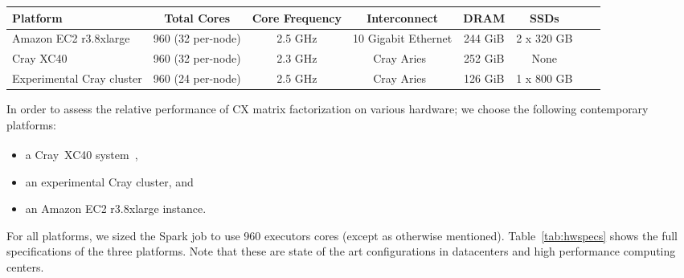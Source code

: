   \begin{table*}
    \begin{center}
    \begin{tabular}{| l | c | c | c | c | c | c | c |}
    \toprule
    \textbf{Platform} & \textbf{Total Cores} & \textbf{Core Frequency} & \textbf{Interconnect} & \textbf{DRAM} & \textbf{SSDs} \\
    \midrule
    Amazon EC2 r3.8xlarge & 960 (32 per-node) & 2.5 GHz & 10 Gigabit Ethernet & 244 GiB & 2 x 320 GB \\
    \midrule
    Cray XC40 & 960 (32 per-node) & 2.3 GHz & Cray Aries~\cite{alverson2012cray,craycascadesc12} & 252 GiB & None \\
    \midrule
    Experimental Cray cluster & 960 (24 per-node) & 2.5 GHz & Cray Aries~\cite{alverson2012cray,craycascadesc12} & 126 GiB & 1 x 800 GB \\
    \bottomrule
    \end{tabular}
    \end{center}
    \caption{Specifications of the three hardware platforms used in these performance experiments.}
    \label{tab:hwspecs}
  \end{table*}

 In order to assess the relative performance of CX matrix factorization on various hardware; we choose the following contemporary platforms:
 \begin{itemize}
 \item a Cray\textregistered~XC40\textsuperscript{\tiny\texttrademark}
 system~\cite{alverson2012cray,craycascadesc12},
 \item an experimental Cray cluster, and
 \item an Amazon EC2 r3.8xlarge instance.
 \end{itemize}
 For all platforms, we sized the Spark job to use 960 executors cores (except as otherwise mentioned).  Table~\ref{tab:hwspecs} shows the full specifications of the three platforms. Note that these are state of the art configurations in datacenters and high performance computing centers. 

